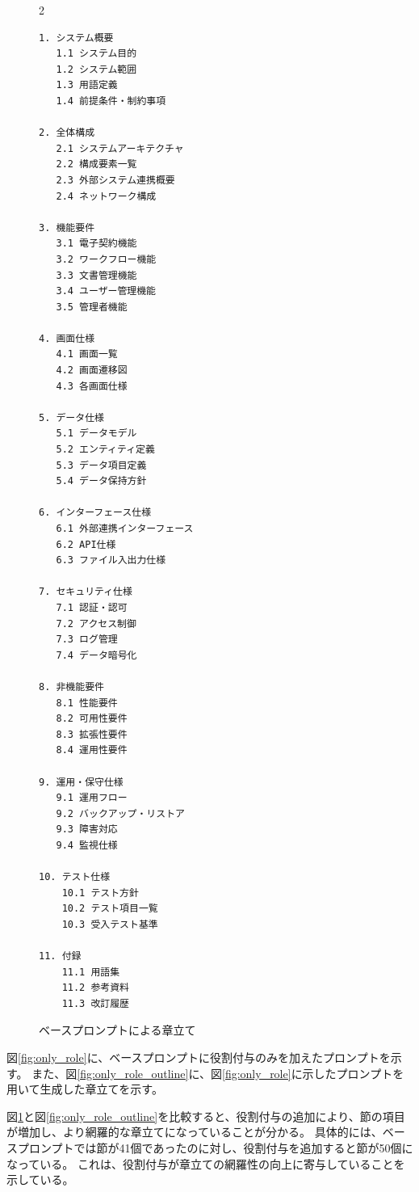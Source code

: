 \begin{figure}[tp]
\begin{tcolorbox}[
  colback=white,
  colframe=orange,
  fonttitle=\bfseries
]
\begin{multicols}{2}
\footnotesize
\ttfamily
\fontsize{7}{8}\selectfont
\begin{verbatim}
1. システム概要
   1.1 システム目的
   1.2 システム範囲
   1.3 用語定義
   1.4 前提条件・制約事項

2. 全体構成
   2.1 システムアーキテクチャ
   2.2 構成要素一覧
   2.3 外部システム連携概要
   2.4 ネットワーク構成

3. 機能要件
   3.1 電子契約機能
   3.2 ワークフロー機能
   3.3 文書管理機能
   3.4 ユーザー管理機能
   3.5 管理者機能

4. 画面仕様
   4.1 画面一覧
   4.2 画面遷移図
   4.3 各画面仕様

5. データ仕様
   5.1 データモデル
   5.2 エンティティ定義
   5.3 データ項目定義
   5.4 データ保持方針

6. インターフェース仕様
   6.1 外部連携インターフェース
   6.2 API仕様
   6.3 ファイル入出力仕様

7. セキュリティ仕様
   7.1 認証・認可
   7.2 アクセス制御
   7.3 ログ管理
   7.4 データ暗号化

8. 非機能要件
   8.1 性能要件
   8.2 可用性要件
   8.3 拡張性要件
   8.4 運用性要件

9. 運用・保守仕様
   9.1 運用フロー
   9.2 バックアップ・リストア
   9.3 障害対応
   9.4 監視仕様

10. テスト仕様
    10.1 テスト方針
    10.2 テスト項目一覧
    10.3 受入テスト基準

11. 付録
    11.1 用語集
    11.2 参考資料
    11.3 改訂履歴

\end{verbatim}
\end{multicols}
\end{tcolorbox}
\caption{ベースプロンプトによる章立て}
\label{fig:base_prompt_outline}
\end{figure}

図\ref{fig:only_role}に、ベースプロンプトに役割付与のみを加えたプロンプトを示す。
また、図\ref{fig:only_role_outline}に、図\ref{fig:only_role}に示したプロンプトを用いて生成した章立てを示す。

図\ref{fig:base_prompt_outline}と図\ref{fig:only_role_outline}を比較すると、役割付与の追加により、節の項目が増加し、より網羅的な章立てになっていることが分かる。
具体的には、ベースプロンプトでは節が41個であったのに対し、役割付与を追加すると節が50個になっている。
これは、役割付与が章立ての網羅性の向上に寄与していることを示している。

